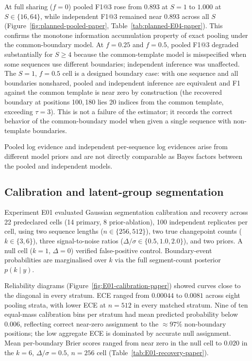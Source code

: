 At full sharing ($f=0$) pooled F1@3 rose from $0.893$ at $S=1$ to $1.000$ at $S\in\{16,64\}$, while independent F1@3 remained near $0.893$ across all $S$ (Figure~\ref{fig:planned-pooled-paper}, Table~\ref{tab:planned-E04-paper}). This confirms the monotone information accumulation property of exact pooling under the common-boundary model. At $f=0.25$ and $f=0.5$, pooled F1@3 degraded substantially for $S\geq4$ because the common-template model is misspecified when some sequences use different boundaries; independent inference was unaffected. The $S=1$, $f=0.5$ cell is a designed boundary case: with one sequence and all boundaries nonshared, pooled and independent inference are equivalent and F1 against the common template is near zero by construction (the recovered boundary at positions 100,\,180 lies 20 indices from the common template, exceeding $\tau=3$). This is not a failure of the estimator; it records the correct behavior of the common-boundary model when given a single sequence with non-template boundaries.

Pooled log evidence and independent per-sequence log evidences arise from different model priors and are not directly comparable as Bayes factors between the pooled and independent models.





\FloatBarrier
\subsection{Calibration and latent-group segmentation}
Experiment E01 evaluated Gaussian segmentation calibration and recovery across 22 predeclared cells (14 primary, 8 prior-ablation), 100 independent replicates per cell, using two sequence lengths ($n\in\{256,512\}$), two true changepoint counts ($k\in\{3,6\}$), three signal-to-noise ratios ($\Delta/\sigma\in\{0.5,1.0,2.0\}$), and two priors. A null cell ($k=1$, $\Delta=0$) verified false-positive control. Boundary-event probabilities are marginalised over $k$ via the full segment-count posterior $p(k\mid y)$.

Reliability diagrams (Figure~\ref{fig:E01-calibration-paper}) showed curves close to the diagonal in every stratum. ECE ranged from $0.00044$ to $0.0081$ across eight pooling strata, with lower ECE at $n=512$ in every matched stratum. Nine of ten equal-mass calibration bins per stratum had mean predicted probability below $0.006$, reflecting correct near-zero assignment to the $\approx97\%$ non-boundary positions; the low aggregate ECE is dominated by accurate null assignment. Mean per-boundary Brier scores ranged from near zero in the null cell to $0.020$ in the $k=6$, $\Delta/\sigma=0.5$, $n=256$ cell (Table~\ref{tab:E01-recovery-paper}).

